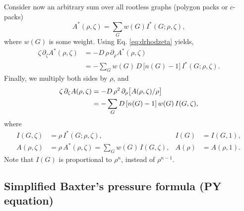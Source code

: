 \documentclass[preprint]{revtex4-1}
\newcommand{\vct}[1]{\mathbf{#1}}
\providecommand{\vr}{} %
\renewcommand{\vr}{\vct{r}}
\begin{document}
Consider now an arbitrary sum
over all rootless graphs (polygon packs or $c$-packs)
\[
  A^*(\rho, \zeta) = \sum_G w(G) I^*(G; \rho, \zeta),
\]
where $w(G)$ is some weight.
%
Using Eq. \eqref{eq:drhodzeta} yields,
\begin{align*}
  \zeta \, \partial_\zeta A^*(\rho, \zeta)
&=
  -D \, \rho \, \partial_\rho A^*(\rho, \zeta)
  \\
&=
  -\sum_G w(G) \, D \, \bigl[ n(G) - 1 \bigr] \, I^*(G; \rho, \zeta).
\end{align*}
%
Finally, we multiply both sides by $\rho$, and
%
\begin{align}
  \zeta \, \partial_\zeta A(\rho, \zeta) %
  &= -D \, \rho^2 \, \partial_\rho \big[ A(\rho, \zeta)/\rho \big] \notag \\
  &= -\sum_G D \, [n(G) - 1] \, w(G) \, I(G, \zeta),
  \label{eq:virialtheorem}
\end{align}
where
\begin{align*}
  I(G, \zeta)    &= \rho \, I^*(G; \rho, \zeta), &
            I(G) &= I(G, 1), \\
  A(\rho, \zeta) &= \rho \, A^*(\rho, \zeta) = \sum_G w(G) \, I(G, \zeta), &
         A(\rho) &= A(\rho, 1).
\end{align*}
%
Note that
$I(G)$ is
proportional to $\rho^n$, instead of $\rho^{n-1}$.




\subsection{\label{sec:vtpy}Simplified Baxter's pressure formula (PY equation)}
\end{document}
